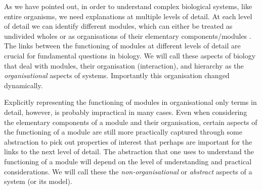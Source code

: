 As we have pointed out, in order to understand complex biological systems, like
entire organisms, we need explanations at multiple levels of detail. At each
level of detail we can identify different modules, which can either be treated
as undivided wholes or as organisations of their elementary components/modules
\citep{varela_autopoiesis:_1974}. The links between the functioning of modules
at different levels of detail are crucial for fundamental questions in
biology. We will call these aspects of biology that deal with modules, their
organisation (interaction), and hierarchy as the \emph{organisational} aspects
of systems. Importantly this organisation changed dynamically.

Explicitly representing the functioning of modules in organisational only terms
in detail, however, is probably impractical in many cases. Even when considering
the elementary components of a module and their organisation, certain aspects of
the functioning of a module are still more practically captured through some
abstraction to pick out properties of interest that perhaps are important for
the links to the next level of detail. The abstraction that one uses to
understand the functioning of a module will depend on the level of understanding
and practical considerations.
We will call these the \emph{non-organisational} or
\emph{abstract} aspects of a system (or its model).

